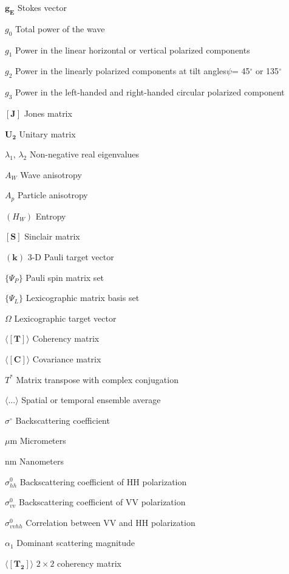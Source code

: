 \begin{symbols}
\item[$\mathbf{g}_\mathbf{E}$] Stokes vector
\item[$g_0$] Total power of the wave
\item[$g_1$] Power in the linear horizontal or vertical polarized components
\item[$g_2$] Power in the linearly polarized components at tilt angles$\psi$= 45$^\circ$ or 135$^\circ$
\item[$g_3$] Power in the left-handed and right-handed circular polarized component
\item[$\mathbf{[J]}$]	Jones matrix
\item[$\bm{U_2}$] Unitary matrix
\item[$\lambda_1$, $\lambda_2$]	Non-negative real eigenvalues
\item[$A_W$] Wave anisotropy 
\item[$A_{p}$] Particle anisotropy
\item[$(H_W)$] Entropy
\item[$\mathbf{[S]}$]	Sinclair matrix
\item[$(\bm{k})$] 3-D Pauli target vector
\item[$\{\Psi_P\}$]	Pauli spin matrix set
\item[$\{\Psi_L\}$]	Lexicographic matrix basis set
\item[$\bm{\varOmega}$]	Lexicographic target vector
\item[$\mathbf{\langle[T]\rangle}$]	Coherency matrix
\item[$\mathbf{\langle[C]\rangle}$]	Covariance matrix
\item[$T^{*}$]	Matrix transpose with complex conjugation
\item[$\langle ... \rangle$]	Spatial or temporal ensemble average
\item[$\sigma$$^\circ$]	Backscattering coefficient
\item[$\mu\mbox{m}$]	Micrometers
\item[$\mbox{nm}$]	Nanometers
\item[$\sigma_{hh}^0$]	Backscattering coefficient of $\mbox{HH}$ polarization
\item[$\sigma_{vv}^0$]	Backscattering coefficient of $\mbox{VV}$ polarization
\item[$\sigma_{vvhh}^0$]	Correlation between $\mbox{VV}$ and $\mbox{HH}$ polarization
\item[$\alpha_1$]	Dominant scattering magnitude
\item[$\mathbf{\langle[T_2]\rangle}$]	$2\times2$ coherency matrix
$$
\end{symbols}
